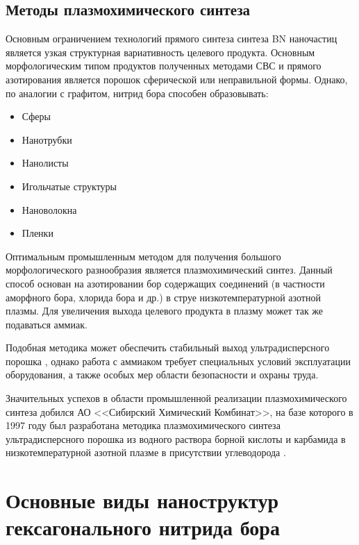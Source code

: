 \subsection{Методы плазмохимического синтеза}%
\label{sub:Методы плазмохимического синтеза}

Основным ограничением технологий прямого синтеза синтеза BN наночастиц является
узкая структурная вариативность целевого продукта. Основным морфологическим типом
продуктов полученных методами СВС и прямого азотирования является порошок сферической
или неправильной формы. Однако, по аналогии с графитом, нитрид бора способен
образовывать:

\begin{itemize}
    \item Сферы 
    \item Нанотрубки
    \item Нанолисты
    \item Игольчатые структуры
    \item Нановолокна
    \item Пленки
\end{itemize}

Оптимальным промышленным методом для получения  большого морфологического 
разнообразия является плазмохимический синтез. Данный способ основан на азотировании
бор содержащих соединений (в частности аморфного бора, хлорида бора и др.) в 
струе низкотемпературной азотной плазмы. Для увеличения выхода целевого продукта
в плазму может так же подаваться аммиак.

Подобная методика может обеспечить стабильный выход ультрадисперсного порошка ,
однако работа с аммиаком требует специальных условий эксплуатации оборудования, а также
особых мер области безопасности и охраны труда. 

Значительных успехов в области промышленной реализации плазмохимического синтеза
добился АО <<Сибирский Химический Комбинат>>, на базе которого в 1997 году был 
разработана методика плазмохимического синтеза ультрадисперсного порошка 
из водного раствора борной кислоты и карбамида в низкотемпературной азотной плазме
в присутствии углеводорода \cite[]{__1997}.  





\section{Основные виды наноструктур гексагонального нитрида бора}%
\label{sec:Основные виды наноструктур гексагонального нитрида бора} 

